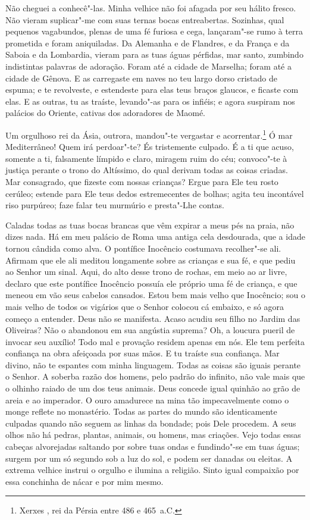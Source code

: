 Não cheguei a conhecê"-las. Minha velhice não foi afagada por seu hálito
fresco. Não vieram suplicar"-me com suas ternas bocas entreabertas.
Sozinhas, qual pequenos vagabundos, plenas de uma fé furiosa e cega,
lançaram"-se rumo à terra prometida e foram aniquiladas. Da Alemanha e de
Flandres, e da França e da Saboia e da Lombardia, vieram para as tuas
águas pérfidas, mar santo, zumbindo indistintas palavras de adoração.
Foram até a cidade de Marselha; foram até a cidade de Gênova. E as
carregaste em naves no teu largo dorso cristado de espuma; e te
revolveste, e estendeste para elas teus braços glaucos, e ficaste com
elas. E as outras, tu as traíste, levando"-as para os infiéis; e agora
suspiram nos palácios do Oriente, cativas dos adoradores de Maomé.

Um orgulhoso rei da Ásia, outrora, mandou"-te vergastar e
acorrentar.\footnote{ Xerxes , rei da Pérsia entre 486 e 465~a.C.} Ó mar
Mediterrâneo! Quem irá perdoar"-te? És tristemente culpado. É a ti que
acuso, somente a ti, falsamente límpido e claro, miragem ruim do céu;
convoco"-te à justiça perante o trono do Altíssimo, do qual derivam todas
as coisas criadas. Mar consagrado, que fizeste com nossas crianças? Ergue
para Ele teu rosto cerúleo; estende para Ele teus dedos estremecentes de
bolhas; agita teu incontável riso purpúreo; faze falar teu murmúrio e
presta"-Lhe contas.

Caladas todas as tuas bocas brancas que vêm expirar a meus pés na praia,
não dizes nada. Há em meu palácio de Roma uma antiga cela desdourada, que
a idade tornou cândida como alva. O pontífice Inocêncio costumava
recolher"-se ali. Afirmam que ele ali meditou longamente sobre as crianças
e sua fé, e que pediu ao Senhor um sinal. Aqui, do alto desse trono de
rochas, em meio ao ar livre, declaro que este pontífice Inocêncio possuía
ele próprio uma fé de criança, e que meneou em vão seus cabelos cansados.
Estou bem mais velho que Inocêncio; sou o mais velho de todos os vigários
que o Senhor colocou cá embaixo, e só agora começo a entender. Deus não se
manifesta. Acaso acudiu seu filho no Jardim das Oliveiras? Não o abandonou
em sua angústia suprema? Oh, a loucura pueril de invocar seu auxílio! Todo
mal e provação residem apenas em nós. Ele tem perfeita confiança na obra
afeiçoada por suas mãos. E tu traíste sua confiança. Mar divino, não te
espantes com minha linguagem. Todas as coisas são iguais perante o Senhor.
A soberba razão dos homens, pelo padrão do infinito, não vale mais que o
olhinho raiado de um dos teus animais. Deus concede igual quinhão ao grão
de areia e ao imperador. O ouro amadurece na mina tão impecavelmente como
o monge reflete no monastério. Todas as partes do mundo são identicamente
culpadas quando não seguem as linhas da bondade; pois Dele procedem. A
seus olhos não há pedras, plantas, animais, ou homens, mas criações. Vejo
todas essas cabeças alvorejadas saltando por sobre tuas ondas e
fundindo"-se em tuas águas; surgem por um só segundo sob a luz do sol, e
podem ser danadas ou eleitas. A extrema velhice instrui o orgulho e
ilumina a religião. Sinto igual compaixão por essa conchinha de nácar e
por mim mesmo.

